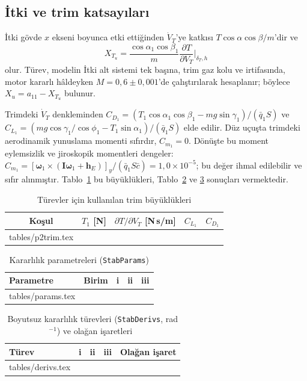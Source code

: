 \documentclass[conf]{new-aiaa}
\makeatletter
\newcommand\tabinput[1]{\@@input #1 }
\makeatother
\begin{document}
\subsection{İtki ve trim katsayıları}
İtki gövde $x$ ekseni boyunca etki ettiğinden $\dot V_T$'ye katkısı $T\cos\alpha\cos\beta/m$'dir ve
\begin{equation}
X_{T_u}=\frac{\cos\alpha_1\cos\beta_1}{m}\frac{\partial T}{\partial V_T}\bigg|_{\delta_T,h}
\end{equation}
olur. Türev, modelin İtki alt sistemi tek başına, trim gaz kolu ve irtifasında, motor kararlı hâldeyken $M=0,6\pm0,001$'de çalıştırılarak hesaplanır; böylece $X_u=a_{11}-X_{T_u}$ bulunur.

Trimdeki $\dot V_T$ denkleminden $C_{D_1}=(T_1\cos\alpha_1\cos\beta_1-mg\sin\gamma_1)/(\bar q_1S)$ ve $C_{L_1}=(mg\cos\gamma_1/\cos\phi_1-T_1\sin\alpha_1)/(\bar q_1S)$ elde edilir. Düz uçuşta trimdeki aerodinamik yunuslama momenti sıfırdır, $C_{m_1}=0$. Dönüşte bu moment eylemsizlik ve jiroskopik momentleri dengeler: $C_{m_1}=[\boldsymbol\omega_1\times(\mathbf I\boldsymbol\omega_1+\mathbf h_E)]_y/(\bar q_1S\bar c)=1,0\times10^{-5}$; bu değer ihmal edilebilir ve sıfır alınmıştır. Tablo~\ref{tab:p2trim} bu büyüklükleri, Tablo~\ref{tab:params} ve \ref{tab:derivs} sonuçları vermektedir.

\begin{table}[hbt!]
\caption{\label{tab:p2trim} Türevler için kullanılan trim büyüklükleri}
\centering
\begin{tabular}{ccccc}
\toprule
Koşul & $T_1$ [N] & $\partial T/\partial V_T$ [N\,s/m] & $C_{L_1}$ & $C_{D_1}$ \\
\midrule
\tabinput{tables/p2trim.tex}
\bottomrule
\end{tabular}
\end{table}

\begin{table}[hbt!]
\caption{\label{tab:params} Kararlılık parametreleri (\texttt{StabParams})}
\centering
\begin{tabular}{llccc}
\toprule
Parametre & Birim & i & ii & iii \\
\midrule
\tabinput{tables/params.tex}
\bottomrule
\end{tabular}
\end{table}

\begin{table}[hbt!]
\caption{\label{tab:derivs} Boyutsuz kararlılık türevleri (\texttt{StabDerivs}, rad$^{-1}$) ve olağan işaretleri~\cite{lec5}}
\centering
\begin{tabular}{lcccc}
\toprule
Türev & i & ii & iii & Olağan işaret \\
\midrule
\tabinput{tables/derivs.tex}
\bottomrule
\end{tabular}
\end{table}
\end{document}
